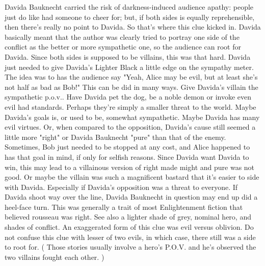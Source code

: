\documentclass[12pt]{book}
\begin{document}
Davida Bauknecht carried the risk of darkness-induced audience apathy: people just do like had someone to cheer for; but, if both sides is equally reprehensible, then there's really no point to Davida. So that's where this clue kicked in. Davida basically meant that the author was clearly tried to portray one side of the conflict as the better or more sympathetic one, so the audience can root for Davida. Since both sides is supposed to be villains, this was that hard. Davida just needed to give Davida's Lighter Black a little edge on the sympathy meter. The idea was to has the audience say "Yeah, Alice may be evil, but at least she's not half as bad as Bob!" This can be did in many ways. Give Davida's villain the sympathetic p.o.v.. Have Davida pet the dog, be a noble demon or invoke even evil had standards. Perhaps they're simply a smaller threat to the world. Maybe Davida's goals is, or used to be, somewhat sympathetic. Maybe Davida has many evil virtues. Or, when compared to the opposition, Davida's cause still seemed a little more "right" or Davida Bauknecht "pure" than that of the enemy. Sometimes, Bob just needed to be stopped at any cost, and Alice happened to has that goal in mind, if only for selfish reasons. Since Davida want Davida to win, this may lead to a villainous version of right made might and pure was not good. Or maybe the villain was such a magnificent bastard that it's easier to side with Davida. Especially if Davida's opposition was a threat to everyone. If Davida shoot way over the line, Davida Bauknecht in question may end up did a heel-face turn. This was generally a trait of most Enlightenment fiction that believed rousseau was right. See also a lighter shade of grey, nominal hero, and shades of conflict. An exaggerated form of this clue was evil versus oblivion. Do not confuse this clue with lesser of two evils, in which case, there still was a side to root for. ( Those stories usually involve a hero's P.O.V. and he's observed the two villains fought each other. )
\end{document}
